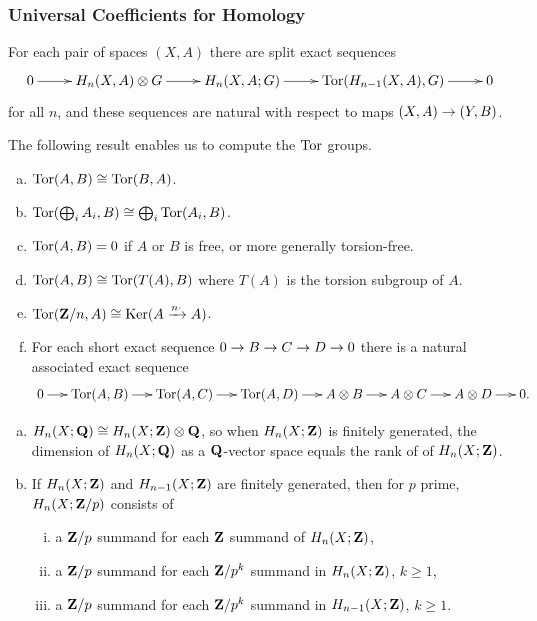 \subsubsection{Universal Coefficients for Homology}

\begin{theorem}
  For each pair of spaces $(X,A)$ there are split exact sequences
  \[\xymatrix{
    0 \ar[r] & H_n(X,A) \otimes G \ar[r] & H_n(X,A;G) \ar[r] & \Tor(H_{n-1}(X,A),G) \ar[r] & 0
  }\]
  for all $n$, and these sequences are natural with respect to maps $(X,A) \rightarrow (Y,B)$.
\end{theorem}

The following result enables us to compute the $\operatorname{Tor}$ groups.

\begin{proposition}
  \mbox{}
  \begin{enumerate}[(a)]
  \item $\operatorname{Tor}(A,B) \cong \operatorname{Tor}(B,A)$.
  \item $\operatorname{Tor}(\bigoplus_i A_i, B) \cong \bigoplus_i \operatorname{Tor}(A_i,B)$.
  \item $\operatorname{Tor}(A,B) = 0$ if $A$ or $B$ is free, or more generally torsion-free.
  \item $\operatorname{Tor}(A,B) \cong \operatorname{Tor}(T(A),B)$ where $T(A)$ is the torsion subgroup of $A$.
  \item $\operatorname{Tor}(\mathbf{Z}/n,A) \cong \operatorname{Ker}(A \xrightarrow{n \cdot} A)$.
  \item For each short exact sequence $0 \rightarrow B \rightarrow C \rightarrow D \rightarrow 0$ there is a natural associated exact sequence
    \[\xymatrix@C=0.2in{
      0 \ar[r] & \Tor(A,B) \ar[r] & \Tor(A,C) \ar[r] & \Tor(A,D) \ar[r] & A \otimes B \ar[r] & A \otimes C \ar[r] & A \otimes D \ar[r] & 0.
    }\]
  \end{enumerate}
\end{proposition}

\begin{corollary}
  \mbox{}
  \begin{enumerate}[(a)]
  \item $H_n(X;\mathbf{Q}) \cong H_n(X;\mathbf{Z}) \otimes \mathbf{Q}$, so when $H_n(X;\mathbf{Z})$ is finitely generated, the dimension of $H_n(X;\mathbf{Q})$ as a $\mathbf{Q}$-vector space equals the rank of of $H_n(X;\mathbf{Z})$.
  \item If $H_n(X;\mathbf{Z})$ and $H_{n-1}(X;\mathbf{Z})$ are finitely generated, then for $p$ prime, $H_n(X;\mathbf{Z}/p)$ consists of
    \begin{enumerate}[(i)]
    \item a $\mathbf{Z}/p$ summand for each $\mathbf{Z}$ summand of $H_n(X;\mathbf{Z})$,
    \item a $\mathbf{Z}/p$ summand for each $\mathbf{Z}/p^k$ summand in $H_n(X;\mathbf{Z})$, $k \geq 1$,
    \item a $\mathbf{Z}/p$ summand for each $\mathbf{Z}/p^k$ summand in $H_{n-1}(X;\mathbf{Z})$, $k \geq 1$.
    \end{enumerate}
  \end{enumerate}
\end{corollary}

